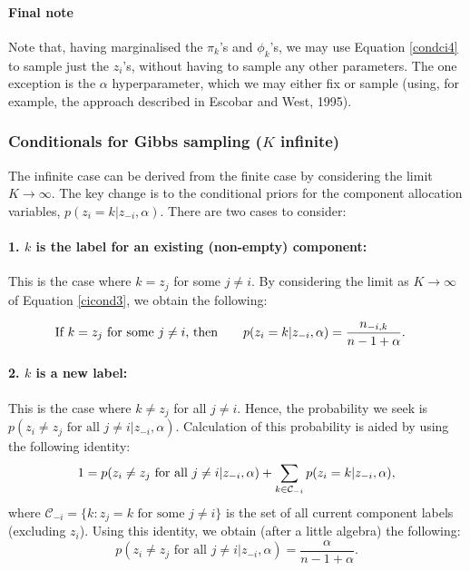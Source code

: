 \documentclass[12pt]{article}
\begin{document}
\paragraph{Final note}
Note that, having marginalised the $\pi_k$'s and $\phi_k$'s, we may use Equation \eqref{condci4} to sample just the $z_i$'s, without having to sample any other parameters.  The one exception is the $\alpha$ hyperparameter, which we may either fix or sample (using, for example, the approach described in Escobar and West, 1995).  

\subsubsection{Conditionals for Gibbs sampling ($K$ infinite)}
The infinite case can be derived from the finite case by considering the limit $K \rightarrow \infty$.  The key change is to the conditional priors for the component allocation variables, $p(z_i = k|z_{-i}, \alpha )$.  There are two cases to consider: 

\paragraph{1. $k$ is the label for an existing (non-empty) component:}
This is the case where $k = z_j$ for some $j \ne i$.  By considering the limit as $K\rightarrow \infty$ of Equation \eqref{cicond3}, we obtain the following:


\begin{align}
\mbox{If $k = z_j$ for some $j \ne i$, then\qquad} p(z_i=k|z_{-i}, \alpha) &= \frac{n_{-i,k}}{n - 1 + \alpha}. \label{infcicond}  
\end{align}

\paragraph{2. $k$ is a new label:}  This is the case where $k \ne z_j$ for all $j \ne i$.  Hence, the probability we seek is $p(z_i \ne z_j \mbox{ for all } j \ne i| z_{-i}, \alpha)$.  Calculation of this probability is aided by using the following identity: 
\begin{equation}
1 = p(z_i \ne z_j \mbox{ for all } j \ne i| z_{-i}, \alpha) + \sum_{k \in \mathcal{C}_{-i}} p(z_i=k|z_{-i}, \alpha), \notag
\end{equation}
where $\mathcal{C} _{-i}= \{k:  z_j = k \mbox{ for some } j\ne i \}$ is the set of all current component labels (excluding $z_i$).  Using this identity, we obtain (after a little algebra) the following: 
\begin{equation}
p(z_i \ne z_j \mbox{ for all } j \ne i| z_{-i}, \alpha) = \frac{\alpha}{n - 1 + \alpha}.\label{infcicond2}
\end{equation}
 
\end{document}
